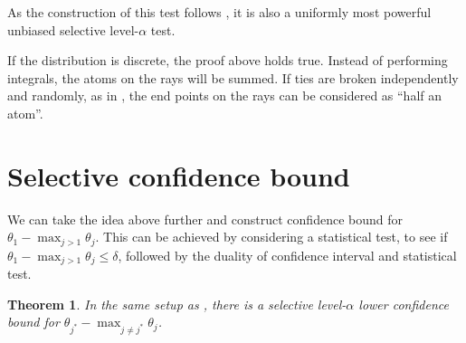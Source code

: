 \documentclass[11pt]{article}
\newtheorem{theorem}{Theorem}
\begin{document}
As the construction of this test follows \cite{Fithian:2014ws}, it is also a uniformly most powerful unbiased selective level-$\alpha$ test.

If the distribution is discrete, the proof above holds true. Instead of performing integrals, the atoms on the rays will be summed. If ties are broken independently and randomly, as in , the end points on the rays can be considered as ``half an atom''.

\section{Selective confidence bound}
\label{sec:selective_confidence_bound}

We can take the idea above further and construct confidence bound for $\theta_1 - \max_{j>1} \theta_j$. This can be achieved by considering a statistical test, to see if $\theta_1 - \max_{j>1} \theta_j \le \delta$, followed by the duality of confidence interval and statistical test.

\begin{theorem}
In the same setup as , there is a selective level-$\alpha$ lower confidence bound for $\theta_{j^*} - \max_{j \ne j^*} \theta_j$.
\end{theorem}
\end{document}
